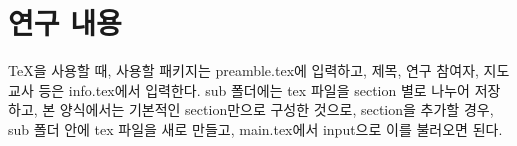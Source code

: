 \section{연구 내용}
TeX을 사용할 때, 사용할 패키지는 preamble.tex에 입력하고, 제목, 연구 참여자, 지도교사 등은 info.tex에서 입력한다. sub 폴더에는 tex 파일을 section 별로 나누어 저장하고, 본 양식에서는 기본적인 section만으로 구성한 것으로, section을 추가할 경우, sub 폴더 안에 tex 파일을 새로 만들고, main.tex에서 input으로 이를 불러오면 된다.